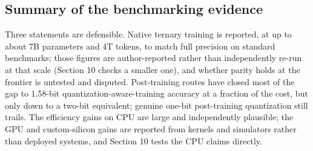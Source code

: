 \documentclass[11pt]{article}
\begin{document}
\subsection{Summary of the benchmarking evidence}

Three statements are defensible. Native ternary training is reported, at up to about 7B
parameters and 4T tokens, to match full precision on standard benchmarks; those figures
are author-reported rather than independently re-run at that scale (Section 10 checks a
smaller one), and whether parity holds at the frontier is untested and disputed. Post-training routes have closed most of the
gap to 1.58-bit quantization-aware-training accuracy at a fraction of the cost, but only
down to a two-bit equivalent; genuine one-bit post-training quantization still trails.
The efficiency gains on CPU are large and independently plausible; the GPU and
custom-silicon gains are reported from kernels and simulators rather than deployed
systems, and Section 10 tests the CPU claims directly.
\end{document}
